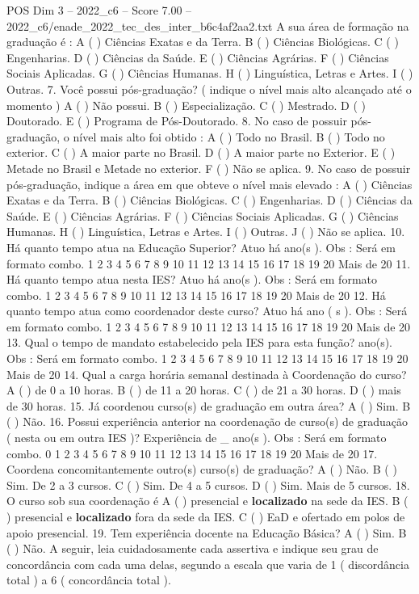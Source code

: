 \begin{textsample}{POS Dim 3 – 2022\_c6 – Score 7.00 – 2022\_c6/enade\_2022\_tec\_des\_inter\_b6c4af2aa2.txt}
A sua área de formação na graduação é : A ( ) Ciências Exatas e da Terra.
B ( ) Ciências Biológicas.
C ( ) Engenharias.
D ( ) Ciências da Saúde.
E ( ) Ciências Agrárias.
F ( ) Ciências Sociais Aplicadas.
G ( ) Ciências Humanas.
H ( ) Linguística, Letras e Artes.
I ( ) Outras. 7.
Você possui pós-graduação? ( indique o nível mais alto alcançado até o momento ) A ( ) Não possui.
B ( ) Especialização.
C ( ) Mestrado.
D ( ) Doutorado.
E ( ) Programa de Pós-Doutorado. 8.
No caso de possuir pós-graduação, o nível mais alto foi obtido : A ( ) Todo no Brasil.
B ( ) Todo no exterior.
C ( ) A maior parte no Brasil.
D ( ) A maior parte no Exterior.
E ( ) Metade no Brasil e Metade no exterior.
F ( ) Não se aplica. 9.
No caso de possuir pós-graduação, indique a área em que obteve o nível mais elevado : A ( ) Ciências Exatas e da Terra.
B ( ) Ciências Biológicas.
C ( ) Engenharias.
D ( ) Ciências da Saúde.
E ( ) Ciências Agrárias.
F ( ) Ciências Sociais Aplicadas.
G ( ) Ciências Humanas.
H ( ) Linguística, Letras e Artes.
I ( ) Outras.
J ( ) Não se aplica. 10.
Há quanto tempo atua na Educação Superior?
Atuo há ano(s ).
Obs : Será em formato combo. 1 2 3 4 5 6 7 8 9 10 11 12 13 14 15 16 17 18 19 20 Mais de 20 11.
Há quanto tempo atua nesta IES?
Atuo há ano(s ).
Obs : Será em formato combo. 1 2 3 4 5 6 7 8 9 10 11 12 13 14 15 16 17 18 19 20 Mais de 20 12.
Há quanto tempo atua como coordenador deste curso?
Atuo há ano ( s ).
Obs : Será em formato combo. 1 2 3 4 5 6 7 8 9 10 11 12 13 14 15 16 17 18 19 20 Mais de 20 13.
Qual o tempo de mandato estabelecido pela IES para esta função? ano(s).
Obs : Será em formato combo. 1 2 3 4 5 6 7 8 9 10 11 12 13 14 15 16 17 18 19 20 Mais de 20 14.
Qual a carga horária semanal destinada à Coordenação do curso?
A ( ) de 0 a 10 horas.
B ( ) de 11 a 20 horas.
C ( ) de 21 a 30 horas.
D ( ) mais de 30 horas. 15.
Já coordenou curso(s) de graduação em outra área?
A ( ) Sim.
B ( ) Não. 16.
Possui experiência anterior na coordenação de curso(s) de graduação ( nesta ou em outra IES )?
Experiência de \_ ano(s ).
Obs : Será em formato combo. 0 1 2 3 4 5 6 7 8 9 10 11 12 13 14 15 16 17 18 19 20 Mais de 20 17.
Coordena concomitantemente outro(s) curso(s) de graduação?
A ( ) Não.
B ( ) Sim.
De 2 a 3 cursos.
C ( ) Sim.
De 4 a 5 cursos.
D ( ) Sim.
Mais de 5 cursos. 18.
O curso sob sua coordenação é A ( ) presencial e \textbf{localizado} na sede da IES.
B ( ) presencial e \textbf{localizado} fora da sede da IES.
C ( ) EaD e ofertado em polos de apoio presencial. 19.
Tem experiência docente na Educação Básica?
A ( ) Sim.
B ( ) Não.
A seguir, leia cuidadosamente cada assertiva e indique seu grau de concordância com cada uma delas, segundo a escala que varia de 1 ( discordância total ) a 6 ( concordância total ).

\end{textsample}
